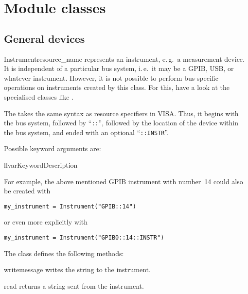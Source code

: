 \documentclass{howto}
\begin{document}
\section{Module classes}

\subsection{General devices}

\begin{classdesc}{Instrument}{resource_name}
  represents an instrument, e.\,g.\ a measurement device.  It is independent of
  a particular bus system, i.\,e.\ it may be a GPIB, USB, or whatever
  instrument.  However, it is not possible to perform bus-specific operations
  on instruments created by this class.  For this, have a look at the
  specialised classes like .

  The  takes the same syntax as resource specifiers in
  VISA\@.  Thus, it begins with the bus system, followed by ``\verb|::|'',
  followed by the location of the device within the bus system, and ended with
  an optional ``\verb|::INSTR|''.

  Possible keyword arguments are:
  \begin{tableii}{ll}{var}{Keyword}{Description}
  \end{tableii}
\end{classdesc}

For example, the above mentioned GPIB instrument with number~14 could also be
created with
\begin{verbatim}
my_instrument = Instrument("GPIB::14")
\end{verbatim}
or even more explicitly with
\begin{verbatim}
my_instrument = Instrument("GPIB0::14::INSTR")
\end{verbatim}

The class  defines the following methods:

\begin{methoddesc}{write}{message}
  writes the string  to the instrument.
\end{methoddesc}

\begin{methoddesc}{read}{}
  returns a string sent from the instrument.
\end{methoddesc}
\end{document}
